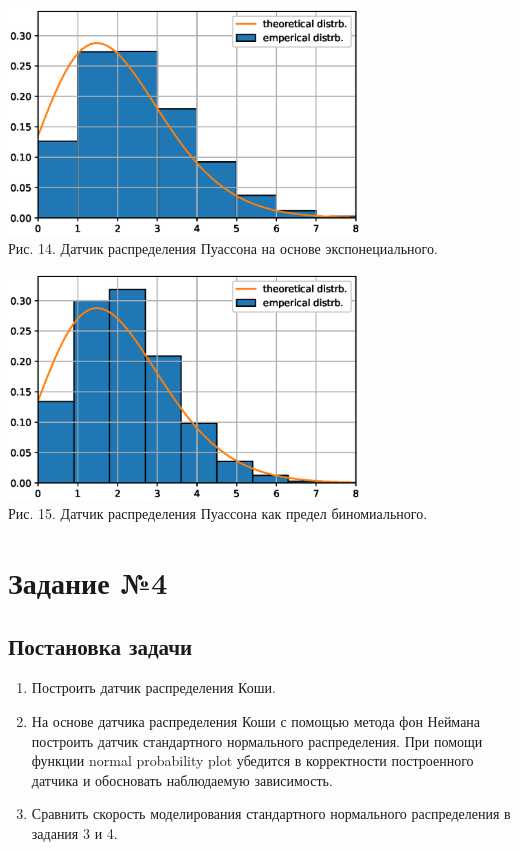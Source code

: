 \documentclass[11pt]{article}
\begin{document}
\begin{center}
	\includegraphics[width=0.7\textwidth]{3_4.eps}\\
	{Рис. 14. Датчик распределения Пуассона на основе экспонециального. }
\end{center}
\begin{center}
	\includegraphics[width=0.7\textwidth]{3_5.eps}\\
	{Рис. 15.  Датчик распределения Пуассона как предел биномиального. }
\end{center}

\newpage

\section{Задание №4}
\subsection{Постановка задачи}
\begin{enumerate}
	\item Построить датчик распределения Коши.
	\item На основе датчика распределения Коши с помощью метода фон Неймана построить датчик стандартного нормального распределения. При помощи функции normal probability plot убедится в корректности построенного датчика и обосновать наблюдаемую зависимость.
	\item Сравнить скорость моделирования стандартного нормального распределения в задания 3 и 4.
\end{enumerate}
\end{document}
